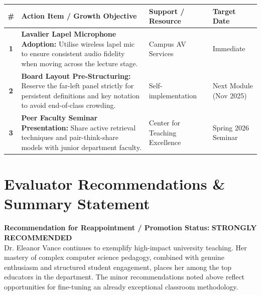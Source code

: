 \documentclass[10pt,a4paper]{article}
\begin{document}
\begin{tcolorbox}[colback=SlateLight, colframe=NavyPrimary, title={\textbf{\color{white}\faTasks\ Post-Observation Action Plan (AY 2025--2026)}}, arc=4pt]
\small
\begin{tabularx}{\textwidth}{@{} c X p{3.2cm} p{2.8cm} @{}}
\rowcolor{TealLight}
\textbf{\color{TealAccent}\#} & \textbf{\color{TealAccent}Action Item / Growth Objective} & \textbf{\color{TealAccent}Support / Resource} & \textbf{\color{TealAccent}Target Date} \\
\midrule

\textbf{1} & \textbf{Lavalier Lapel Microphone Adoption:} Utilise wireless lapel mic to ensure consistent audio fidelity when moving across the lecture stage. & Campus AV Services & Immediate \\
\addlinespace[4pt]

\textbf{2} & \textbf{Board Layout Pre-Structuring:} Reserve the far-left panel strictly for persistent definitions and key notation to avoid end-of-class crowding. & Self-implementation & Next Module (Nov 2025) \\
\addlinespace[4pt]

\textbf{3} & \textbf{Peer Faculty Seminar Presentation:} Share active retrieval techniques and pair-think-share models with junior department faculty. & Center for Teaching Excellence & Spring 2026 Seminar \\

\bottomrule
\end{tabularx}
\end{tcolorbox}

\vspace{14pt}

\section{Evaluator Recommendations \& Summary Statement}

\begin{infocard}[colback=white, colframe=TealAccent, boxrule=1pt]
\small\color{TextDark}
\textbf{Recommendation for Reappointment / Promotion Status:} \textcolor{GreenPass}{\textbf{STRONGLY RECOMMENDED}}\\[4pt]
Dr. Eleanor Vance continues to exemplify high-impact university teaching. Her mastery of complex computer science pedagogy, combined with genuine enthusiasm and structured student engagement, places her among the top educators in the department. The minor recommendations noted above reflect opportunities for fine-tuning an already exceptional classroom methodology.
\end{infocard}
\end{document}
